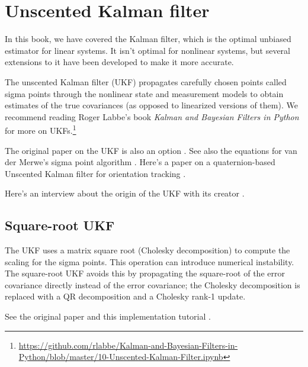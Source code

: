 \section{Unscented Kalman filter}
\label{sec:ukf}

In this book, we have covered the Kalman filter, which is the optimal unbiased
estimator for linear \glspl{system}. It isn't optimal for nonlinear
\glspl{system}, but several extensions to it have been developed to make it more
accurate.

The unscented Kalman filter (UKF) propagates carefully chosen points called
sigma points through the nonlinear state and measurement models to obtain
estimates of the true covariances (as opposed to linearized versions of them).
We recommend reading Roger Labbe's book \textit{Kalman and Bayesian Filters in
Python} for more on
UKFs.\footnote{\url{https://github.com/rlabbe/Kalman-and-Bayesian-Filters-in-Python/blob/master/10-Unscented-Kalman-Filter.ipynb}}

The original paper on the UKF is also an option \cite{bib:ukf}. See also the
equations for van der Merwe's sigma point algorithm \cite{bib:ukf_sigma_points}.
Here's a paper on a quaternion-based Unscented Kalman filter for orientation
tracking \cite{bib:ukf_state_tracking}.

Here's an interview about the origin of the UKF with its creator
\cite{bib:first-hand_the_ut}.

\subsection{Square-root UKF}

The UKF uses a matrix square root (Cholesky decomposition) to compute the
scaling for the sigma points. This operation can introduce numerical
instability. The square-root UKF avoids this by propagating the square-root of
the error covariance directly instead of the error covariance; the Cholesky
decomposition is replaced with a QR decomposition and a Cholesky rank-1 update.

See the original paper \cite{bib:ukf_square_root} and this implementation
tutorial \cite{bib:ukf_square_root_tutorial}.
